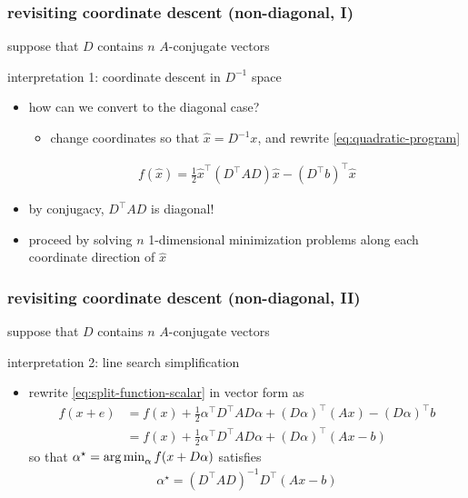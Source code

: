 \documentclass[10pt,dvipsnames*]{beamer}
\begin{document}
\begin{frame}
  \frametitle{revisiting coordinate descent (non-diagonal, I)}
  \pause
  \begin{assumption*}
    suppose that $D$ contains $n$ $A$-conjugate vectors
  \end{assumption*}
  \pause
  \begin{alertblock}{interpretation 1: coordinate descent in $D^{-1}$ space}
    \begin{itemize}
      \item how can we convert to the diagonal case?
      \pause
      \begin{itemize}
        \item change coordinates so that $\hat{x} = D^{-1}x$, and rewrite \cref{eq:quadratic-program}
      \end{itemize}
      \begin{align}
        \label{eq:quadratic-program-coordinate}
        f(\hat{x}) = \tfrac 12 \hat{x}^{\top} (D^{\top} A D) \hat{x} - (D^{\top}b)^{\top} \hat{x}
      \end{align}
      \item \pause by conjugacy, $D^{\top} A D$ is diagonal!
      \item \pause proceed by solving $n$ 1-dimensional minimization problems along each coordinate direction of $\hat{x}$ \cite{nocedal_numerical_2006}
    \end{itemize}
  \end{alertblock}
\end{frame}
%
\begin{frame}
  \frametitle{revisiting coordinate descent (non-diagonal, II)}
  \pause
  \begin{assumption*}
    suppose that $D$ contains $n$ $A$-conjugate vectors
  \end{assumption*}
  \pause
  \begin{alertblock}{interpretation 2: line search simplification}
    \begin{itemize}
      \item rewrite \cref{eq:split-function-scalar} in vector form as
      \begin{align}
        \label{eq:split-function-vector}
        f(x + e) &= f(x) + \tfrac 12 \alpha^{\top} D^{\top} A D \alpha + (D\alpha)^{\top} (Ax) - (D\alpha)^{\top} b \\
        &= f(x) + \tfrac 12 \alpha^{\top} D^{\top} A D \alpha + (D\alpha)^{\top} (Ax - b)
      \end{align}
      so that $\alpha^{\star} = \operatorname*{arg\,min}_{\alpha} f(x + D\alpha)$ satisfies
      \begin{align}
        \label{eq:split-minimization-vector}
        \alpha^{\star} = (D^{\top} A D)^{-1} D^{\top} (Ax-b)
      \end{align}
    \end{itemize}
  \end{alertblock}
\end{frame}
\end{document}

